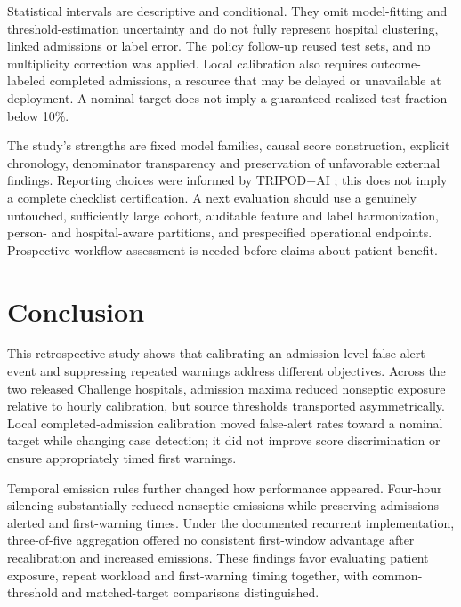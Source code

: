 \documentclass[preprint,12pt]{elsarticle}
\begin{document}
Statistical intervals are descriptive and conditional. They omit model-fitting and threshold-estimation uncertainty and do not fully represent hospital clustering, linked admissions or label error. The policy follow-up reused test sets, and no multiplicity correction was applied. Local calibration also requires outcome-labeled completed admissions, a resource that may be delayed or unavailable at deployment. A nominal target does not imply a guaranteed realized test fraction below 10\%.

The study's strengths are fixed model families, causal score construction, explicit chronology, denominator transparency and preservation of unfavorable external findings. Reporting choices were informed by TRIPOD+AI \cite{tripod}; this does not imply a complete checklist certification. A next evaluation should use a genuinely untouched, sufficiently large cohort, auditable feature and label harmonization, person- and hospital-aware partitions, and prespecified operational endpoints. Prospective workflow assessment is needed before claims about patient benefit.

\section{Conclusion}
This retrospective study shows that calibrating an admission-level false-alert event and suppressing repeated warnings address different objectives. Across the two released Challenge hospitals, admission maxima reduced nonseptic exposure relative to hourly calibration, but source thresholds transported asymmetrically. Local completed-admission calibration moved false-alert rates toward a nominal target while changing case detection; it did not improve score discrimination or ensure appropriately timed first warnings.

Temporal emission rules further changed how performance appeared. Four-hour silencing substantially reduced nonseptic emissions while preserving admissions alerted and first-warning times. Under the documented recurrent implementation, three-of-five aggregation offered no consistent first-window advantage after recalibration and increased emissions. These findings favor evaluating patient exposure, repeat workload and first-warning timing together, with common-threshold and matched-target comparisons distinguished.
\end{document}
